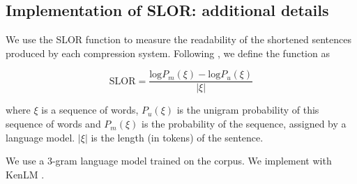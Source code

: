 \subsection{Implementation of SLOR: additional details}

We use the SLOR function to measure the readability of the shortened sentences produced by each compression system. Following \cite{lau2015unsupervised}, we define the function as 

\begin{equation}
\text{SLOR}=\frac{\text{log}P_m(\xi) - \text{log}P_u(\xi)}{|\xi|}
\end{equation}

where $\xi$ is a sequence of words, $P_u(\xi)$ is the unigram probability of this sequence of words and $P_m(\xi)$ is the probability of the sequence, assigned by a language model.  $|\xi|$ is the length (in tokens) of the sentence.

We use a 3-gram language model trained on the \citet{filippova2013overcoming} corpus. We implement with KenLM \cite{Heafield-kenlm}.


